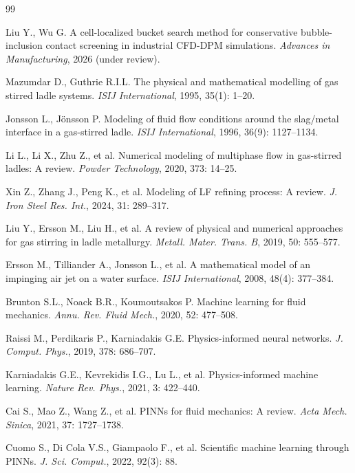 \documentclass[12pt,a4paper]{article}
\begin{document}

\begin{thebibliography}{99}

 Liu Y., Wu G. A cell-localized bucket search method for conservative bubble-inclusion contact screening in industrial CFD-DPM simulations. \textit{Advances in Manufacturing}, 2026 (under review).

 Mazumdar D., Guthrie R.I.L. The physical and mathematical modelling of gas stirred ladle systems. \textit{ISIJ International}, 1995, 35(1): 1--20.

 Jonsson L., J\"{o}nsson P. Modeling of fluid flow conditions around the slag/metal interface in a gas-stirred ladle. \textit{ISIJ International}, 1996, 36(9): 1127--1134.

 Li L., Li X., Zhu Z., et al. Numerical modeling of multiphase flow in gas-stirred ladles: A review. \textit{Powder Technology}, 2020, 373: 14--25.

 Xin Z., Zhang J., Peng K., et al. Modeling of LF refining process: A review. \textit{J. Iron Steel Res. Int.}, 2024, 31: 289--317.

 Liu Y., Ersson M., Liu H., et al. A review of physical and numerical approaches for gas stirring in ladle metallurgy. \textit{Metall. Mater. Trans. B}, 2019, 50: 555--577.

 Ersson M., Tilliander A., Jonsson L., et al. A mathematical model of an impinging air jet on a water surface. \textit{ISIJ International}, 2008, 48(4): 377--384.

 Brunton S.L., Noack B.R., Koumoutsakos P. Machine learning for fluid mechanics. \textit{Annu. Rev. Fluid Mech.}, 2020, 52: 477--508.

 Raissi M., Perdikaris P., Karniadakis G.E. Physics-informed neural networks. \textit{J. Comput. Phys.}, 2019, 378: 686--707.

 Karniadakis G.E., Kevrekidis I.G., Lu L., et al. Physics-informed machine learning. \textit{Nature Rev. Phys.}, 2021, 3: 422--440.

 Cai S., Mao Z., Wang Z., et al. PINNs for fluid mechanics: A review. \textit{Acta Mech. Sinica}, 2021, 37: 1727--1738.

 Cuomo S., Di Cola V.S., Giampaolo F., et al. Scientific machine learning through PINNs. \textit{J. Sci. Comput.}, 2022, 92(3): 88.


\end{thebibliography}
\end{document}

